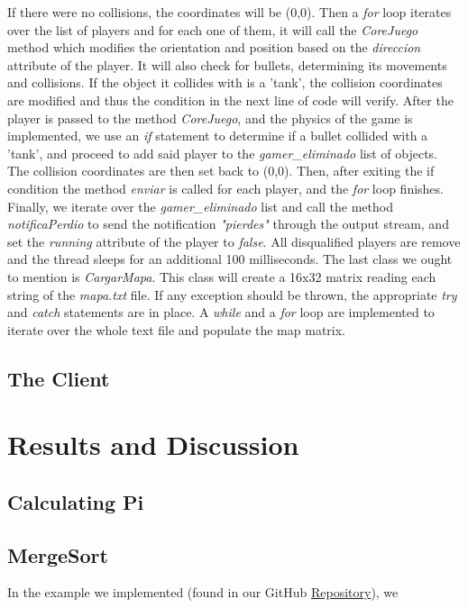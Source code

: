 \documentclass[10pt,a4paper]{article}
\theoremstyle{definition}
\begin{document}
If there were no collisions, the coordinates will be (0,0).
Then a \textit{for} loop iterates over the list of players and for each one of them, it will call the \textit{CoreJuego} method which modifies the orientation and position based on the \textit{direccion} attribute of the player. 
It will also check for bullets, determining its movements and collisions. 
If the object it collides with is a 'tank', the collision coordinates are modified and thus the condition in the next line of code will verify.
After the player is passed to the method \textit{CoreJuego}, and the physics of the game is implemented, we use an \textit{if} statement to determine if a bullet collided with a 'tank', and proceed to add said player to the \textit{gamer\_eliminado} list of objects. 
The collision coordinates are then set back to (0,0). 
Then, after exiting the if condition the method \textit{enviar} is called for each player, and the \textit{for} loop finishes. 
Finally, we iterate over the \textit{gamer\_eliminado} list and call the method \textit{notificaPerdio} to send the notification \textit{"pierdes"} through the output stream, and set the \textit{running} attribute of the player to \textit{false}. 
All disqualified players are remove and the thread sleeps for an additional 100 milliseconds.
The last class we ought to mention is \textit{CargarMapa}. 
This class will create a 16x32 matrix reading each string of the \textit{mapa.txt} file. 
If any exception should be thrown, the appropriate \textit{try} and \textit{catch} statements are in place. 
A \textit{while} and a \textit{for} loop are implemented to iterate over the whole text file and populate the map matrix.
\subsection{The Client}

\section{Results and Discussion}
\subsection{Calculating Pi}


\subsection{MergeSort}


In the example we implemented (found in our GitHub \href{https://github.com/ezevallos/CC462_Battle-City}{Repository}), we 
\end{document}
